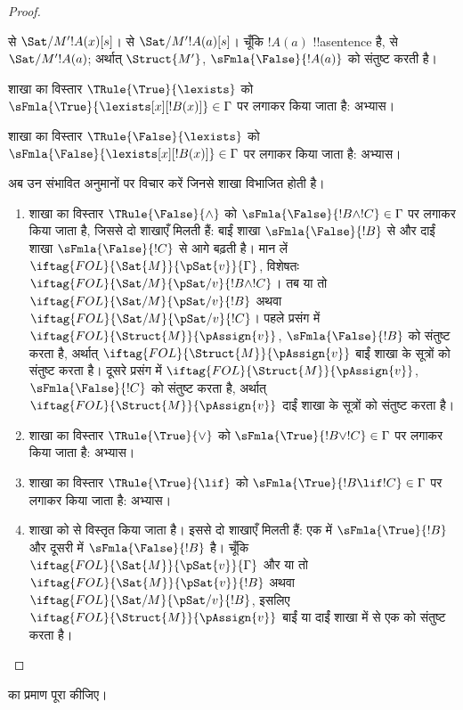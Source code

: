 \documentclass[../../../include/open-logic-section]{subfiles}
\begin{document}
\begin{proof}
\begin{enumerate}
{   से $\Sat/{M'}{!A(x)}[s]$।
   से $\Sat/{M'}{!A(a)}[s]$। चूँकि
  $!A(a)$ !!a{sentence} है,
   से $\Sat/{M'}{!A(a)}$;
  अर्थात् $\Struct{M'}$, $\sFmla{\False}{!A(a)}$ को संतुष्ट करती है।
\item शाखा का विस्तार $\TRule{\True}{\lexists}$ को
  $\sFmla{\True}{\lexists[x][!B(x)]} \in \Gamma$ पर लगाकर किया जाता है: अभ्यास।
\item शाखा का विस्तार $\TRule{\False}{\lexists}$ को
  $\sFmla{\False}{\lexists[x][!B(x)]} \in \Gamma$ पर लगाकर किया जाता है: अभ्यास।}{}
\end{enumerate}
अब उन संभावित अनुमानों पर विचार करें जिनसे शाखा विभाजित होती है।
\begin{enumerate}
\item शाखा का विस्तार $\TRule{\False}{\land}$ को
  $\sFmla{\False}{!B \land !C} \in \Gamma$ पर लगाकर किया जाता है, जिससे दो शाखाएँ
  मिलती हैं: बाईं शाखा $\sFmla{\False}{!B}$ से और दाईं शाखा
  $\sFmla{\False}{!C}$ से आगे बढ़ती है। मान लें
  $\iftag{FOL}{\Sat{M}}{\pSat{v}}{\Gamma}$, विशेषतः
  $\iftag{FOL}{\Sat/{M}}{\pSat/{v}}{!B \land !C}$। तब या तो
  $\iftag{FOL}{\Sat/{M}}{\pSat/{v}}{!B}$ अथवा
  $\iftag{FOL}{\Sat/{M}}{\pSat/{v}}{!C}$। पहले प्रसंग में
  $\iftag{FOL}{\Struct{M}}{\pAssign{v}}$, $\sFmla{\False}{!B}$ को संतुष्ट
  करता है, अर्थात् $\iftag{FOL}{\Struct{M}}{\pAssign{v}}$ बाईं शाखा के
  सूत्रों को संतुष्ट करता है। दूसरे प्रसंग
  में $\iftag{FOL}{\Struct{M}}{\pAssign{v}}$, $\sFmla{\False}{!C}$ को
  संतुष्ट करता है, अर्थात् $\iftag{FOL}{\Struct{M}}{\pAssign{v}}$ दाईं शाखा
  के सूत्रों को संतुष्ट करता है।
\item शाखा का विस्तार $\TRule{\True}{\lor}$ को
  $\sFmla{\True}{!B \lor !C} \in \Gamma$ पर लगाकर किया जाता है: अभ्यास।
\item शाखा का विस्तार $\TRule{\True}{\lif}$ को
  $\sFmla{\True}{!B \lif !C} \in \Gamma$ पर लगाकर किया जाता है: अभ्यास।
\item शाखा को \Cut से विस्तृत किया जाता है। इससे दो शाखाएँ मिलती हैं:
  एक में $\sFmla{\True}{!B}$ और दूसरी में $\sFmla{\False}{!B}$ है। चूँकि
  $\iftag{FOL}{\Sat{M}}{\pSat{v}}{\Gamma}$ और या तो
  $\iftag{FOL}{\Sat{M}}{\pSat{v}}{!B}$ अथवा
  $\iftag{FOL}{\Sat/{M}}{\pSat/{v}}{!B}$, इसलिए
  $\iftag{FOL}{\Struct{M}}{\pAssign{v}}$ बाईं या दाईं शाखा में से एक को
  संतुष्ट करता है।
\end{enumerate}
\end{proof}

\begin{prob}
 का प्रमाण पूरा कीजिए।
\end{prob}
\tagendprob
\end{document}
